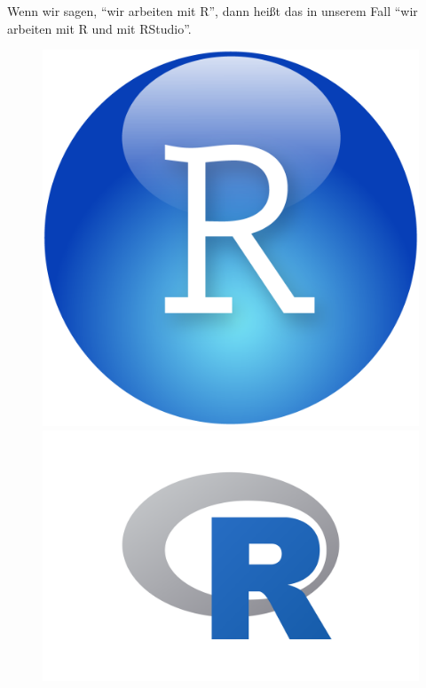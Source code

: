 \documentclass[
  letterpaper,
  DIV=11,
  numbers=noendperiod]{scrartcl}
\theoremstyle{definition}
\theoremstyle{definition}
\theoremstyle{definition}
\theoremstyle{remark}
\begin{document}
Wenn wir sagen, ``wir arbeiten mit R'', dann heißt das in unserem Fall
``wir arbeiten mit R und mit RStudio''.

\begin{figure}

\begin{minipage}{0.25\linewidth}
\includegraphics{img/R-logo.png}\end{minipage}%
%
\begin{minipage}{0.25\linewidth}


\end{minipage}%
%
\begin{minipage}{0.50\linewidth}
\includegraphics{img/rlogo.png}\end{minipage}%

\end{figure}%
\end{document}
